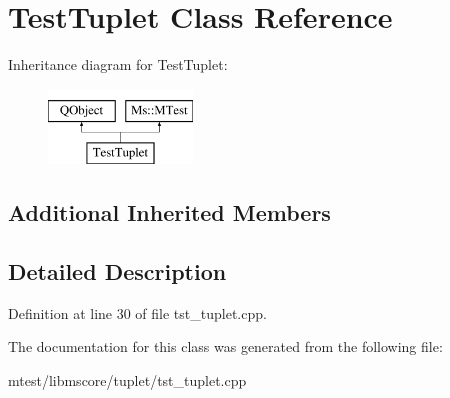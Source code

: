 \hypertarget{class_test_tuplet}{}\section{Test\+Tuplet Class Reference}
\label{class_test_tuplet}
Inheritance diagram for Test\+Tuplet\+:\begin{figure}[H]
\begin{center}
\leavevmode
\includegraphics[height=2.000000cm]{class_test_tuplet}
\end{center}
\end{figure}
\subsection*{Additional Inherited Members}


\subsection{Detailed Description}


Definition at line 30 of file tst\+\_\+tuplet.\+cpp.



The documentation for this class was generated from the following file\+:\begin{DoxyCompactItemize}
\item 
mtest/libmscore/tuplet/tst\+\_\+tuplet.\+cpp\end{DoxyCompactItemize}
